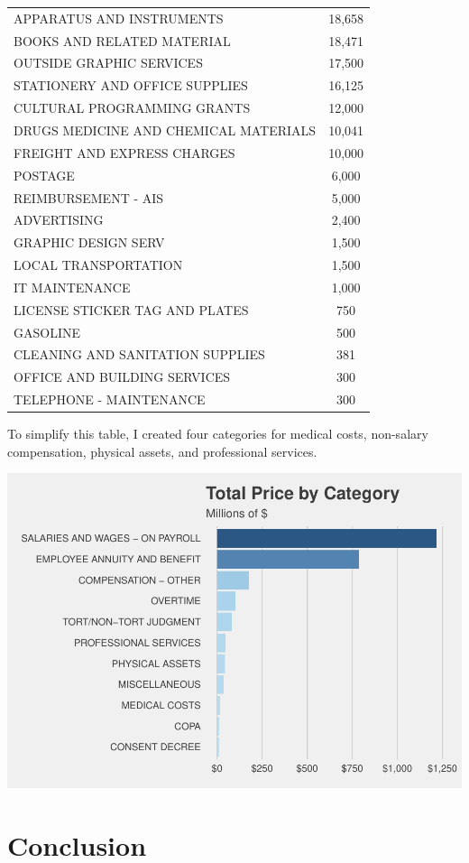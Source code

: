 \documentclass[
]{article}
\begin{document}
\begin{longtable}[]{@{}lc@{}}
APPARATUS AND INSTRUMENTS & 18,658\tabularnewline
BOOKS AND RELATED MATERIAL & 18,471\tabularnewline
OUTSIDE GRAPHIC SERVICES & 17,500\tabularnewline
STATIONERY AND OFFICE SUPPLIES & 16,125\tabularnewline
CULTURAL PROGRAMMING GRANTS & 12,000\tabularnewline
DRUGS MEDICINE AND CHEMICAL MATERIALS & 10,041\tabularnewline
FREIGHT AND EXPRESS CHARGES & 10,000\tabularnewline
POSTAGE & 6,000\tabularnewline
REIMBURSEMENT - AIS & 5,000\tabularnewline
ADVERTISING & 2,400\tabularnewline
GRAPHIC DESIGN SERV & 1,500\tabularnewline
LOCAL TRANSPORTATION & 1,500\tabularnewline
IT MAINTENANCE & 1,000\tabularnewline
LICENSE STICKER TAG AND PLATES & 750\tabularnewline
GASOLINE & 500\tabularnewline
CLEANING AND SANITATION SUPPLIES & 381\tabularnewline
OFFICE AND BUILDING SERVICES & 300\tabularnewline
TELEPHONE - MAINTENANCE & 300\tabularnewline
\bottomrule
\end{longtable}

To simplify this table, I created four categories for medical costs,
non-salary compensation, physical assets, and professional services.

\begin{center}\includegraphics{cpd_budget_analysis_files/figure-latex/total price by category reduced-1} \end{center}

\hypertarget{conclusion}{%
\section{Conclusion}\label{conclusion}}

\setlength{\parindent}{5ex}
\end{document}
